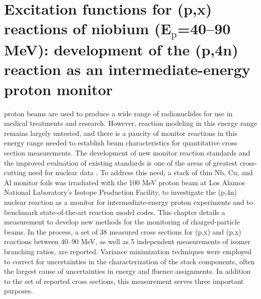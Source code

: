 
\chapter{Excitation functions for (p,x) reactions of niobium (E\texorpdfstring{$_{\text{p}}$=40--90\,}{Ep = 40--90 }MeV):  development of the \texorpdfstring{(p,4n)}{93Nb(p,4n)90Mo} reaction as an intermediate-energy proton monitor}\label{sec:chapter_ipf}


 proton beams are used to produce a wide range of radionuclides for use in medical treatments and research.  
However, reaction modeling in this energy range remains largely untested, and there is a paucity of monitor reactions 
in this energy range 
needed to establish beam characteristics  for quantitative cross section measurements.  
The development of new monitor reaction standards and the improved evaluation of existing standards is one of the areas of greatest cross-cutting need for nuclear data \cite{bernstein2015nuclear}. 
To address this need, a stack  of thin Nb, Cu, and Al monitor foils was irradiated with the 100 MeV proton beam at  Los Alamos National Laboratory's Isotope Production Facility,  to investigate the (p,4n) nuclear reaction as a  monitor for intermediate-energy proton experiments and to benchmark state-of-the-art reaction model codes.
This chapter details a measurement to develop new methods for the monitoring of charged-particle beams.
In the process, a set of 38 measured  cross sections for  (p,x) and  (p,x) reactions between 40--90 MeV, as well as 5 independent measurements of isomer branching ratios, are reported. 
Variance minimization techniques were employed  to correct for uncertainties in  the characterization of the stack components, often the largest cause of uncertainties in energy and  fluence assignments.
In addition to the set of reported cross sections, this measurement serves three important purposes.



